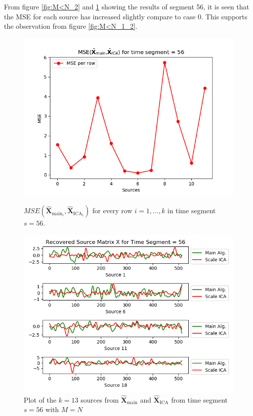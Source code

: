 \noindent 
From figure \ref{fig:M<N_2} and \ref{fig:M<N_3} showing the results of segment 56, it is seen that the MSE for each source has increased slightly compare to case 0. This supports the observation from figure \ref{fig:M<N_1_2}.      
\begin{figure}[H]
\begin{widepage}
    \begin{minipage}[t]{.45\textwidth}
\centering
\includegraphics[width=1\linewidth]{figures/ch_7/mse_third_removed_ica_timeseg55.png}
\caption{$MSE\left(\hat{\mathbf{X}}_{\text{main}_{i}},\hat{\mathbf{X}}_{\text{ICA}_{i}}\right)$ for every row $i = 1, \hdots, k$ in time segment $s=56$.}
\label{fig:M<N_2}
\end{minipage} 
\hspace{0.5cm}
\begin{minipage}[t]{.45\textwidth}
\centering
\includegraphics[width=1\linewidth]{figures/ch_7/EEG_third_removed_scaled_timeseg55S1_CClean.png}
\caption{Plot of the $k = 13$ sources from $\hat{\mathbf{X}}_{\text{main}}$ and $\hat{\mathbf{X}}_{\text{ICA}}$ from time segment $s = 56$ with $M=N$}
	\label{fig:M<N_3}
    \end{minipage}
\end{widepage}
\end{figure}
